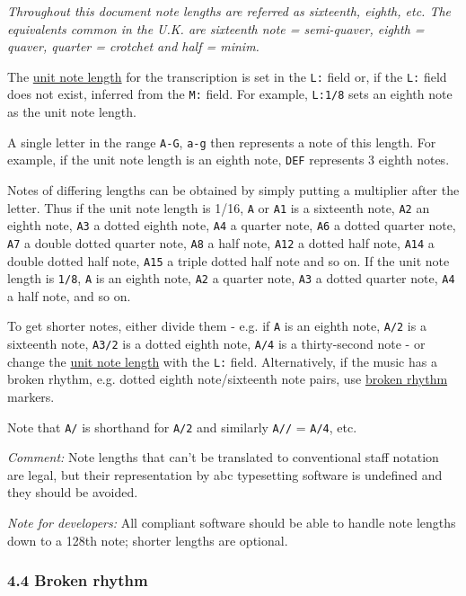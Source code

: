 \emph{Throughout this document note lengths are referred as sixteenth,
eighth, etc. The equivalents common in the U.K. are sixteenth note =
semi-quaver, eighth = quaver, quarter = crotchet and half = minim.}

The \protect\hyperlink{lunit_note_length}{unit note length} for the
transcription is set in the \texttt{L:} field or, if the \texttt{L:}
field does not exist, inferred from the \texttt{M:} field. For example,
\texttt{L:1/8} sets an eighth note as the unit note length.

A single letter in the range \texttt{A-G}, \texttt{a-g} then represents
a note of this length. For example, if the unit note length is an eighth
note, \texttt{DEF} represents 3 eighth notes.

Notes of differing lengths can be obtained by simply putting a
multiplier after the letter. Thus if the unit note length is 1/16,
\texttt{A} or \texttt{A1} is a sixteenth note, \texttt{A2} an eighth
note, \texttt{A3} a dotted eighth note, \texttt{A4} a quarter note,
\texttt{A6} a dotted quarter note, \texttt{A7} a double dotted quarter
note, \texttt{A8} a half note, \texttt{A12} a dotted half note,
\texttt{A14} a double dotted half note, \texttt{A15} a triple dotted
half note and so on. If the unit note length is \texttt{1/8}, \texttt{A}
is an eighth note, \texttt{A2} a quarter note, \texttt{A3} a dotted
quarter note, \texttt{A4} a half note, and so on.

To get shorter notes, either divide them - e.g. if \texttt{A} is an
eighth note, \texttt{A/2} is a sixteenth note, \texttt{A3/2} is a dotted
eighth note, \texttt{A/4} is a thirty-second note - or change the
\protect\hyperlink{lunit_note_length}{unit note length} with the
\texttt{L:} field. Alternatively, if the music has a broken rhythm, e.g.
dotted eighth note/sixteenth note pairs, use
\protect\hyperlink{broken_rhythm}{broken rhythm} markers.

Note that \texttt{A/} is shorthand for \texttt{A/2} and similarly
\texttt{A//} = \texttt{A/4}, etc.

\emph{Comment:} Note lengths that can't be translated to conventional
staff notation are legal, but their representation by abc typesetting
software is undefined and they should be avoided.

\emph{Note for developers:} All compliant software should be able to
handle note lengths down to a 128th note; shorter lengths are optional.

\hypertarget{broken_rhythm}{\subsubsection{4.4 Broken
rhythm}\label{broken_rhythm}}

